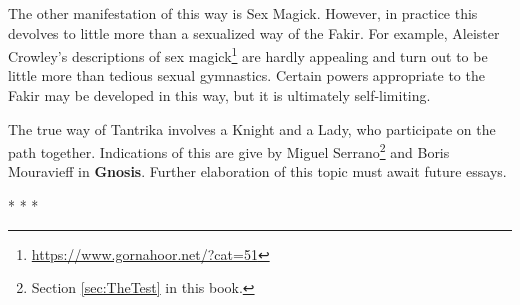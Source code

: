 The other manifestation of this way is Sex Magick. However, in practice this devolves to little more than a sexualized way of the Fakir. For example, Aleister Crowley's descriptions of sex magick\footnote{\url{https://www.gornahoor.net/?cat=51}} are hardly appealing and turn out to be little more than tedious sexual gymnastics. Certain powers appropriate to the Fakir may be developed in this way, but it is ultimately self-limiting. 

The true way of Tantrika involves a Knight and a Lady, who participate on the path together. Indications of this are give by Miguel Serrano\footnote{Section \ref{sec:TheTest} in this book.} and Boris Mouravieff in \textbf{Gnosis}. Further elaboration of this topic must await future essays.




\begin{center}* * *\end{center}


